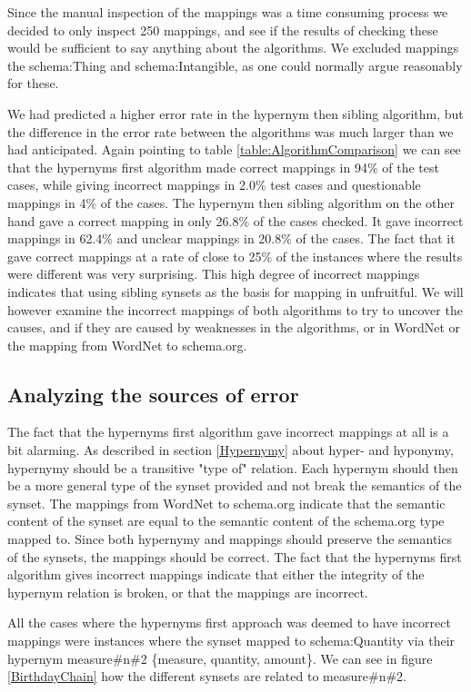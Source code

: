 Since the manual inspection of the mappings was a time consuming process we decided to only inspect 250 mappings,
and see if the results of checking these would be sufficient to say anything about the algorithms.
We excluded mappings the schema:Thing and schema:Intangible, as one could normally argue reasonably for these.

We had predicted a higher error rate in the hypernym then sibling algorithm,
but the difference in the error rate between the algorithms was much larger than we had anticipated.
Again pointing to table \ref{table:AlgorithmComparison} we can see that the hypernyms first algorithm
made correct mappings in 94\% of the test cases,
while giving incorrect mappings in 2.0\% test cases and questionable mappings in 4\% of the cases.
The hypernym then sibling algorithm on the other hand gave a correct mapping in only 26.8\% of the cases checked.
It gave incorrect mappings in 62.4\% and unclear mappings in 20.8\% of the cases.
The fact that it gave correct mappings at a rate of close to 25\% of the instances where the results were different was very surprising.
This high degree of incorrect mappings indicates that using sibling synsets as the basis for mapping in unfruitful.
We will however examine the incorrect mappings of both algorithms to try to uncover the causes,
and if they are caused by weaknesses in the algorithms, or in WordNet or the mapping from WordNet to schema.org.

\subsection{Analyzing the sources of error}
The fact that the hypernyms first algorithm gave incorrect mappings at all is a bit alarming.
As described in section \ref{Hypernymy} about hyper- and hyponymy, hypernymy should be a transitive "type of" relation.
Each hypernym should then be a more general type of the synset provided and not break the semantics of the synset.
The mappings from WordNet to schema.org indicate that the semantic content of the synset are equal to the
semantic content of the schema.org type mapped to.
Since both hypernymy and mappings should preserve the semantics of the synsets, the mappings should be correct.
The fact that the hypernyms first algorithm gives incorrect mappings indicate that either the integrity of the hypernym relation is broken,
or that the mappings are incorrect.

All the cases where the hypernyms first approach was deemed to have incorrect mappings were instances where the synset
mapped to schema:Quantity via their hypernym measure\#n\#2 \{measure, quantity, amount\}.
We can see in figure \ref{BirthdayChain} how the different synsets are related to measure\#n\#2.

